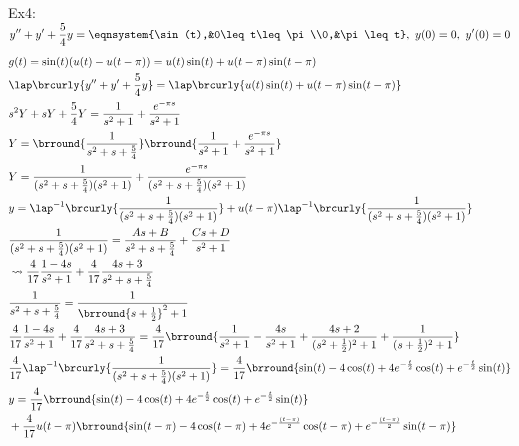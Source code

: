 Ex4: $\displaystyle{y''+y'+\frac{5}{4}y=\eqnsystem{\sin(t),&0\leq t\leq \pi\\0,&\pi\leq t},\ y(0)=0,\ y'(0)=0}$
\begin{align*}
    &g(t)=\sin(t)(u(t)-u(t-\pi))=u(t)\sin(t)+u(t-\pi)\sin(t-\pi)\\
    &\lap\brcurly{y''+y'+\frac{5}{4}y}=\lap\brcurly{u(t)\sin(t)+u(t-\pi)\sin(t-\pi)}\\
    &s^2Y+sY+\frac{5}{4}Y=\frac{1}{s^2+1}+\frac{e^{-\pi s}}{s^2+1}\\
    &Y=\brround{\frac{1}{s^2+s+\frac{5}{4}}}\brround{\frac{1}{s^2+1}+\frac{e^{-\pi s}}{s^2+1}}\\
    &Y=\frac{1}{(s^2+s+\frac{5}{4})(s^2+1)}+\frac{e^{-\pi s}}{(s^2+s+\frac{5}{4})(s^2+1)}\\
    &y=\lap^{-1}\brcurly{\frac{1}{(s^2+s+\frac{5}{4})(s^2+1)}}+u(t-\pi)\lap^{-1}\brcurly{\frac{1}{(s^2+s+\frac{5}{4})(s^2+1)}}\\
    &\frac{1}{(s^2+s+\frac{5}{4})(s^2+1)}=\frac{As+B}{s^2+s+\frac{5}{4}}+\frac{Cs+D}{s^2+1}\\
    &\leadsto\frac{4}{17}\frac{1-4s}{s^2+1}+\frac{4}{17}\frac{4s+3}{s^2+s+\frac{5}{4}}\\
    &\frac{1}{s^2+s+\frac{5}{4}}=\frac{1}{\brround{s+\frac{1}{2}}^2+1}\\
    &\frac{4}{17}\frac{1-4s}{s^2+1}+\frac{4}{17}\frac{4s+3}{s^2+s+\frac{5}{4}}=\frac{4}{17}\brround{\frac{1}{s^2+1}-\frac{4s}{s^2+1}+\frac{4s+2}{(s^2+\frac{1}{2})^2+1}+\frac{1}{(s+\frac{1}{2})^2+1}}\\
    &\frac{4}{17}\lap^{-1}\brcurly{\frac{1}{(s^2+s+\frac{5}{4})(s^2+1)}}=\frac{4}{17}\brround{\sin(t)-4\cos(t)+4e^{-\frac{t}{2}}\cos(t)+e^{-\frac{t}{2}}\sin(t)}\\
    &y=\frac{4}{17}\brround{\sin(t)-4\cos(t)+4e^{-\frac{t}{2}}\cos(t)+e^{-\frac{t}{2}}\sin(t)}\\
    &+\frac{4}{17}u(t-\pi)\brround{\sin(t-\pi)-4\cos(t-\pi)+4e^{-\frac{(t-\pi)}{2}}\cos(t-\pi)+e^{-\frac{(t-\pi)}{2}}\sin(t-\pi)}\\
\end{align*}